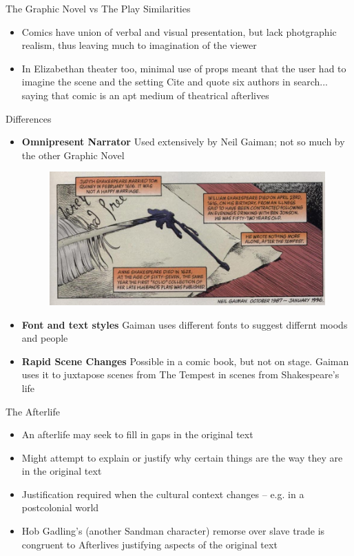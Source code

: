 \documentclass{beamer}
\begin{document}
  \begin{frame}[allowframebreaks]{The Graphic Novel vs The Play}
    Similarities
    \begin{itemize}
    \item Comics have union of verbal and visual presentation, but lack photgraphic realism, thus leaving much to imagination of the viewer
    \item In Elizabethan theater too, minimal use of props meant that the user had to imagine the scene and the setting
      Cite and quote six authors in search... saying that comic is an apt medium of theatrical afterlives
    \end{itemize}
    Differences
    \begin{itemize}
    \item \textbf{Omnipresent Narrator} Used extensively by Neil Gaiman; not so much by the other Graphic Novel
      \begin{figure}[htp]
        \begin{center}
          \centering
          \includegraphics[scale=0.35]{omnipresent.jpg}
        \end{center}
      \end{figure}
    \item \textbf{Font and text styles} Gaiman uses different fonts to suggest differnt moods and people
    \item \textbf{Rapid Scene Changes} Possible in a comic book, but not on stage. Gaiman uses it to juxtapose scenes from The Tempest in scenes from Shakespeare's life
    \end{itemize}
  \end{frame}
  
  
  \begin{frame}{The Afterlife}
    \begin{itemize}
  \item An afterlife may seek to fill in gaps in the original text
  \item Might attempt to explain or justify why certain things are the way they are in the original text
  \item Justification required when the cultural context changes -- e.g. in a postcolonial world
  \item Hob Gadling's (another Sandman character) remorse over slave trade is congruent to Afterlives justifying aspects of the original text
    \end{itemize}
  \end{frame}
  
\end{document}
